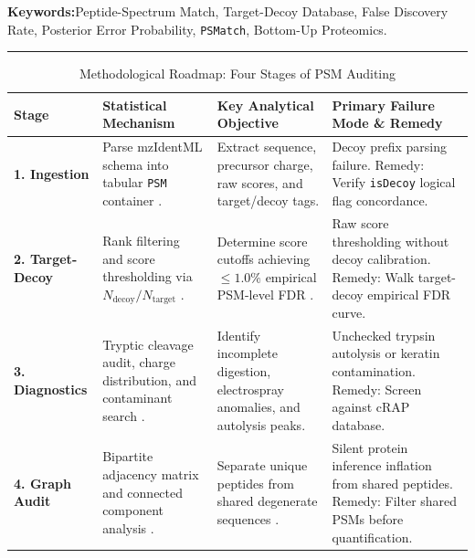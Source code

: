 \documentclass[11pt,twoside,openright]{book}
\begin{document}
\noindent
\textbf{Keywords:}\enspace Peptide-Spectrum Match, Target-Decoy Database, False Discovery Rate, Posterior Error Probability, \texttt{PSMatch}, Bottom-Up Proteomics.

\vspace{0.8em}
\noindent\rule{\textwidth}{0.4pt}


\begin{table}[ht]
\centering
\caption{Methodological Roadmap: Four Stages of PSM Auditing}
\label{tab:psm_roadmap}
\small
\begin{tabularx}{\textwidth}{l p{3.8cm} p{4.2cm} X}
\toprule
\textbf{Stage} & \textbf{Statistical Mechanism} & \textbf{Key Analytical Objective} & \textbf{Primary Failure Mode \& Remedy} \\
\midrule
\textbf{1. Ingestion} & Parse mzIdentML schema \cite{jones2012mzidentml} into tabular \texttt{PSM} container \cite{gatto2023psmatch}. & Extract sequence, precursor charge, raw scores, and target/decoy tags. & Decoy prefix parsing failure. Remedy: Verify \texttt{isDecoy} logical flag concordance. \\
\addlinespace
\textbf{2. Target-Decoy} & Rank filtering and score thresholding via $N_{\text{decoy}} / N_{\text{target}}$ \cite{elias2007target}. & Determine score cutoffs achieving $\le 1.0\%$ empirical PSM-level FDR \cite{storey2002direct}. & Raw score thresholding without decoy calibration. Remedy: Walk target-decoy empirical FDR curve. \\
\addlinespace
\textbf{3. Diagnostics} & Tryptic cleavage audit, charge distribution, and contaminant search \cite{mellacheruvu2013crapome}. & Identify incomplete digestion, electrospray anomalies, and autolysis peaks. & Unchecked trypsin autolysis or keratin contamination. Remedy: Screen against cRAP database. \\
\addlinespace
\textbf{4. Graph Audit} & Bipartite adjacency matrix and connected component analysis \cite{nesvizhskii2005interpretation}. & Separate unique peptides from shared degenerate sequences \cite{nesvizhskii2010survey}. & Silent protein inference inflation from shared peptides. Remedy: Filter shared PSMs before quantification. \\
\bottomrule
\end{tabularx}
\end{table}
\end{document}
